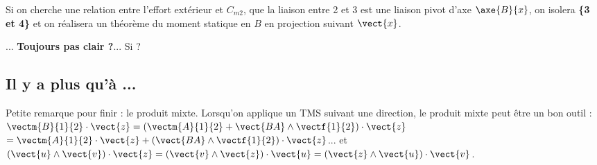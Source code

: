 Si on cherche une relation entre l'effort extérieur et $C_{m2}$, que la liaison entre 2 et 3 est une liaison pivot d'axe 
$\axe{B}{x}$, on isolera \textbf{\{3 et 4\}} et on réalisera un théorème du moment statique en $B$ en projection suivant $\vect{x}$.

... \textbf{Toujours pas clair ?}... Si ?



\subsection{Il y a plus qu'à ...}

Petite remarque pour finir : le produit mixte. Lorsqu'on applique un TMS suivant une direction, le produit mixte peut être un bon outil :
$\vectm{B}{1}{2}\cdot \vect{z} = \left( \vectm{A}{1}{2} + \vect{BA}\wedge \vectf{1}{2}\right)\cdot \vect{z}$
$=  \vectm{A}{1}{2}\cdot \vect{z} + \left(\vect{BA}\wedge \vectf{1}{2}\right)\cdot \vect{z}$...
et $\left(\vect{u} \wedge \vect{v}\right) \cdot \vect{z}= \left(\vect{v} \wedge \vect{z}\right) \cdot \vect{u}= \left(\vect{z} \wedge \vect{u}\right) \cdot \vect{v}$.
